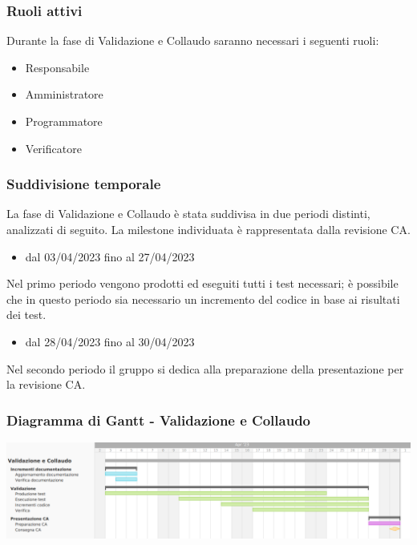\subsubsection{Ruoli attivi}
Durante la fase di Validazione e Collaudo saranno necessari i seguenti ruoli:
\begin{itemize}
	\item Responsabile
    \item Amministratore
    \item Programmatore
    \item Verificatore
\end{itemize}

\subsubsection{Suddivisione temporale}
La fase di Validazione e Collaudo è stata suddivisa in due periodi distinti, analizzati di seguito. La milestone individuata è rappresentata dalla revisione CA.

\begin{itemize}
    \item dal 03/04/2023 fino al 27/04/2023
\end{itemize}
Nel primo periodo vengono prodotti ed eseguiti tutti i test necessari; è possibile che in questo periodo sia necessario un incremento del codice in base ai risultati dei test.

\begin{itemize}
    \item dal 28/04/2023 fino al 30/04/2023
\end{itemize}
Nel secondo periodo il gruppo si dedica alla preparazione della presentazione per la revisione CA.

\subsubsection{Diagramma di Gantt - Validazione e Collaudo}
\includegraphics[width=\textwidth]{src/img/4_collaudo.png}\\
